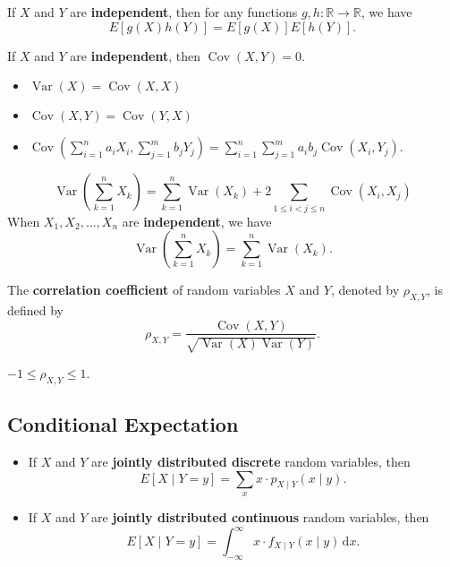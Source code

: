  If \(X\) and \(Y\) are \textbf{independent}, then for
any functions \(g, h: \mathbb{R}\rightarrow \mathbb{R}\), we have 
\[E[g(X)h(Y)] = E[g(X)]E[h(Y)].\]

 If \(X\) and \(Y\) are \textbf{independent}, then
\(\operatorname{Cov}\left(X,Y\right)= 0\).

\begin{itemize}
  \item \(\operatorname{Var}\left(X\right)=\operatorname{Cov}\left(X,X\right)\)
  \item \(\operatorname{Cov}\left(X,Y\right)=\operatorname{Cov}\left(Y,
    X\right)\)
  \item \(\operatorname{Cov}\left(\sum\limits_{i=1}^{n}a_iX_i,
    \sum\limits_{j=1}^m b_jY_j\right) =
    \sum\limits_{i=1}^{n}\sum\limits_{j=1}^m a_ib_j\operatorname{Cov}\left(
    X_i,Y_j\right).\)
\end{itemize}

\[\operatorname{Var}\left(\sum\limits_{k=1}^{n}X_k\right) =
\sum\limits_{k=1}^{n}\operatorname{Var}\left(X_k\right)+2\sum_{1 \leq i < j
\leq n} \operatorname{Cov}\left(X_i,X_j\right)\]
When \(X_1, X_2, \ldots, X_n\) are \textbf{independent}, we have
\[\operatorname{Var}\left(\sum\limits_{k=1}^{n}X_k\right) =
\sum\limits_{k=1}^{n}\operatorname{Var}\left(X_k\right).\]

 The \textbf{correlation coefficient} of
random variables \(X\) and \(Y\), denoted by \(\rho_{X,Y}\), is defined by
\[\rho_{X,Y} = \frac{\operatorname{Cov}\left(X,Y\right)}
{\sqrt{\operatorname{Var}\left(X\right)\operatorname{Var}\left(Y\right)}}.\]

 \(-1 \leq \rho_{X,Y} \leq 1\).

\subsection{Conditional Expectation}

\begin{itemize}
  \item If \(X\) and \(Y\) are \textbf{jointly distributed
discrete} random variables, then 
\[E\left[X\mid Y=y\right]=\sum\limits_{x}x\cdot p_{X\mid Y}\left(x\mid
y\right).\]
  \item If \(X\) and \(Y\) are \textbf{jointly distributed continuous} random
    variables, then
\[E\left[X\mid Y=y\right]=\int_{-\infty}^{\infty}x\cdot f_{X\mid Y}\left(x\mid
y\right)\,\mathrm{d}x.\]
\end{itemize}

